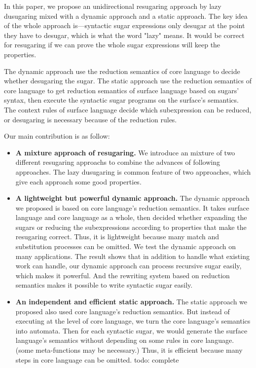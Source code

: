 
In this paper, we propose an unidirectional resugaring approach by lazy dusugaring mixed with a dynamic approach and a static approach. The key idea of the whole approach is---syntactic sugar expressions only desugar at the point they have to desugar, which is what the word "lazy" means. It would be correct for resugaring if we can prove the whole sugar expressions will keep the properties.

The dynamic approach use the reduction semantics\cite{reduction} of core language to decide whether desugaring the sugar. The static approach use the reduction semantics of core language to get reduction semantics of surface language based on sugars' syntax, then execute the syntactic sugar programs on the surface's semantics. The context rules of surface language decide which subexpression can be reduced, or desugaring is necessary because of the reduction rules.

Our main contribution is as follow:
\begin{itemize}
\item {\bfseries A mixture approach of resugaring.} We introduce an mixture of two different resugaring approachs to combine the advances of following approaches. The lazy dusugaring is common feature of two approaches, which give each approach some good properties.
\item {\bfseries A lightweight but powerful dynamic approach.} The dynamic approach we proposed is based on core language's reduction semantics. It takes surface language and core language as a whole, then decided whether expanding the sugars or reducing the subexpressions according to properties that make the resugaring correct. Thus, it is lightweight because many match and substitution processes can be omitted. We test the dynamic approach on many applications. The result shows that in addition to handle what existing work can handle, our dynamic approach can process recursive sugar easily, which makes it powerful. And the rewriting system based on reduction semantics makes it possible to write syntactic sugar easily.
\item {\bfseries An independent and efficient static approach.} The static approach we proposed also used core language's reduction semantics. But instead of executing at the level of core language, we turn the core language's semantics into automata. Then for each syntactic sugar, we would generate the surface language's semantics without depending on some rules in core language. (some meta-functions may be necessary.) Thus, it is efficient because many steps in core language can be omitted. todo: complete
\end{itemize}


